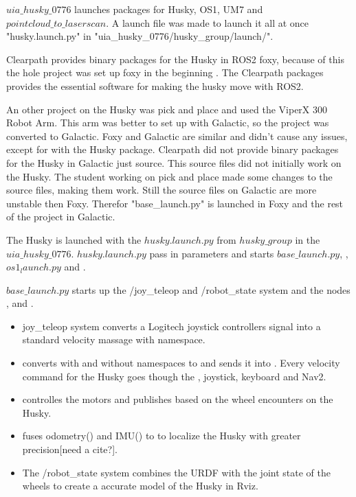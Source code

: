 $uia\_husky\_0776$ launches packages for Husky, OS1, UM7 and $pointcloud\_to\_laserscan$. A launch file was made to launch it all at once "husky.launch.py" in "uia\_husky\_0776/husky\_group/launch/".


Clearpath provides binary packages for the Husky in ROS2 foxy, because of this the hole project was set up foxy in the beginning . The Clearpath packages provides the essential software for making the husky move with ROS2.

An other project on the Husky was pick and place and used the ViperX 300 Robot Arm. This arm was better to set up with Galactic, so the project was converted to Galactic. Foxy and Galactic are similar and didn't cause any issues, except for with the Husky package. Clearpath did not provide binary packages for the Husky in Galactic just source. This source files did not initially work on the Husky. The student working on pick and place made some changes to the source files, making them work. Still the source files on Galactic are more unstable then Foxy. Therefor "base\_launch.py" is launched in Foxy and the rest of the project in Galactic. 

The Husky is launched with the $husky.launch.py$ from $husky\_group$ in the $uia\_husky\_0776$. $husky.launch.py$ pass in parameters and starts $base\_launch.py$, , $os1_launch.py$ and . 

$base\_launch.py$ starts up the /joy\_teleop and /robot\_state system and the nodes ,  and . 

\begin{itemize}
    \item joy\_teleop system converts a Logitech joystick controllers signal into  a standard velocity massage with namespace. 
    
    \item {} converts  with and without namespaces to  and sends it into . Every velocity command for the Husky goes though the , joystick, keyboard and Nav2. 
    
    \item {} controlles the motors and publishes  based on the wheel encounters on the Husky. 
    
    \item {} fuses odometry() and IMU() to  to localize the Husky with greater precision[need a cite?]. 
    
    \item The /robot\_state system combines the URDF with the joint state of the wheels to create a accurate model of the Husky in Rviz. 
    
\end{itemize}

